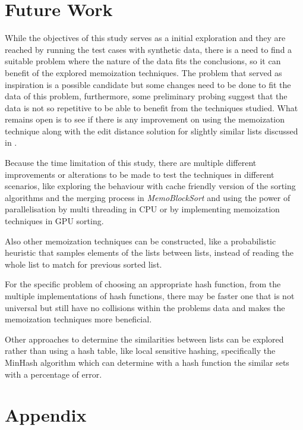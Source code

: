 \documentclass[a4paper,12pt]{article}
\begin{document}
\section{Future Work}

While the objectives of this study serves as a initial exploration and they are reached by running the test cases with synthetic data, there is a need to find a suitable problem where the nature of the data fits the conclusions, so it can benefit of  the explored memoization techniques. The problem that served as inspiration \cite{Arch2015} is a possible candidate but some changes need to be done to fit the data of this problem, furthermore, some preliminary probing suggest that the data is not so repetitive to be able to benefit from the techniques studied. What remains open is to see if there is any improvement on using the memoization technique along with the edit distance solution for slightly similar lists discussed in \cite{Arch2015}.

Because the time limitation of this study, there are multiple different improvements or alterations to be made to test the techniques in different scenarios, like exploring the behaviour with cache friendly version of the sorting algorithms and the merging process in {\it MemoBlockSort} and using the power of parallelisation by multi threading in CPU or by implementing memoization techniques in GPU sorting.

Also other memoization techniques can be constructed, like a probabilistic heuristic that samples elements of the lists between lists, instead of reading the whole list to match for previous sorted list.

For the specific problem of choosing an appropriate hash function, from the multiple implementations of hash functions, there may be faster one that is not universal but still have no collisions within the problems data and makes the memoization techniques more beneficial.

Other approaches to determine the similarities between lists can be explored rather than using a hash table, like local sensitive hashing, specifically the MinHash algorithm which can determine with a hash function the similar sets with a percentage of error.






\section{Appendix}
\end{document}
